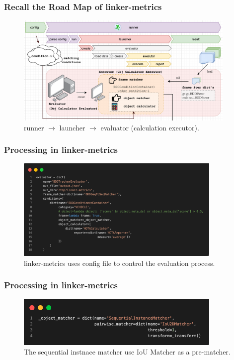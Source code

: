 \documentclass[slidetop, mathserif]{beamer}
\begin{document}
\begin{frame}
	\frametitle{Recall the Road Map of linker-metrics}

	\begin{figure}
		\includegraphics[width=300pt]{pics/fig12.png}
		\caption{runner $\to$ launcher $\to$ evaluator (calculation executor).}
	\end{figure}
\end{frame}

\begin{frame}
	\frametitle{Processing in linker-metrics}

	\begin{figure}
		\includegraphics[width=280pt]{pics/fig13.png}
		\caption{linker-metrics uses config file to control the evaluation process.}
	\end{figure}

\end{frame}

\begin{frame}
	\frametitle{Processing in linker-metrics}
	\begin{figure}
		\includegraphics[width=280pt]{pics/fig14.png}
		\caption{The sequential instnace matcher use IoU Matcher as a pre-matcher.}
	\end{figure}
\end{frame}
\end{document}
